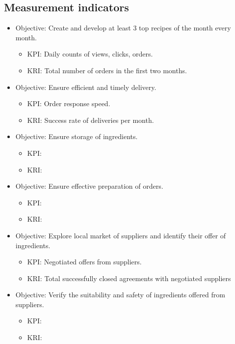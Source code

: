 \documentclass[11pt,a4paper]{article}
\begin{document}
\subsection{Measurement indicators}

\begin{itemize}
    \item Objective: Create and develop at least 3 top recipes of the month every month.
    \begin{itemize}
        \item KPI: Daily counts of views, clicks, orders.
        \item KRI: Total number of orders in the first two months.
    \end{itemize}
    \item Objective: Ensure efficient and timely delivery.
    \begin{itemize}
        \item KPI: Order response speed.
        \item KRI: Success rate of deliveries per month.
    \end{itemize}
    \item Objective: Ensure storage of ingredients.
    \begin{itemize}
        \item KPI: 
        \item KRI: 
    \end{itemize}
    \item Objective: Ensure effective preparation of orders.
    \begin{itemize}
        \item KPI: 
        \item KRI: 
    \end{itemize}
    \item Objective: Explore local market of suppliers and identify their offer of ingredients.
    \begin{itemize}
        \item KPI: Negotiated offers from suppliers.
        \item KRI: Total successfully closed agreements with negotiated suppliers
    \end{itemize}
    \item Objective: Verify the suitability and safety of ingredients offered from suppliers.
    \begin{itemize}
        \item KPI: 
        \item KRI: 
    \end{itemize}

\end{itemize}
\end{document}
